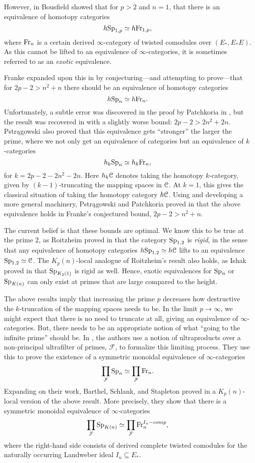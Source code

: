 However, in \cite{bousfield_1985} Bousfield showed that for $p>2$ and $n=1$, that there is an equivalence of homotopy categories
$$h \mathrm{Sp}_{1,p}\simeq h \mathrm{Fr}_{1,p},$$
where $\mathrm{Fr}_{n}$ is a certain derived $\infty$-category of twisted comodules over $(E_*, E_*E)$. As this cannot be lifted to an equivalence of $\infty$-categories, it is sometimes referred to as an \emph{exotic} equivalence. 

Franke expanded upon this in \cite{franke_96} by conjecturing---and attempting to prove---that for $2p-2 > n^2+n$ there should be an equivalence of homotopy categories
$$h \mathrm{Sp}_{n}\simeq h \mathrm{Fr}_{n}.$$
Unfortunately, a subtle error was discovered in the proof by Patchkoria in \cite{patchkoria_2013}, but the result was recovered in \cite{pstragowski_2021} with a slightly worse bound: $2p-2>2n^2+2n$. Pstr{\k a}gowski also proved that this equivalence gets ``stronger'' the larger the prime, where we not only get an equivalence of categories but an equivalence of $k$-categories 
$$h_k \mathrm{Sp}_{n}\simeq h_k \mathrm{Fr}_{n},$$
for $k=2p-2-2n^2-2n$. Here $h_k \EuScript{C}$ denotes taking the homotopy $k$-category, given by $(k-1)$-truncating the mapping spaces in $\EuScript{C}$. At $k=1$, this gives the classical situation of taking the homotopy category $h\EuScript{C}$. Using and developing a more general machinery, Pstr{\k a}gowski and Patchkoria proved in \cite{patchkoria-pstragowski_2021} that the above equivalence holds in Franke's conjectured bound, $2p-2>n^2+n$. 

The current belief is that these bounds are optimal. We know this to be true at the prime $2$, as Roitzheim proved in \cite{roitzheim_07} that the category $\mathrm{Sp}_{1,2}$ is \emph{rigid}, in the sense that any equivalence of homotopy categories $h\mathrm{Sp}_{1,2} \simeq h\EuScript{C}$ lifts to an equivalence $\mathrm{Sp}_{1,2}\simeq \EuScript{C}$. The $K_p(n)$-local analogue of Roitzheim's result also holds, as Ishak proved in \cite{ishak_19} that $\mathrm{Sp}_{K_2(1)}$ is rigid as well. Hence, exotic equivalences for $\mathrm{Sp}_{n}$ or $\mathrm{Sp}_{K(n)}$ can only exist at primes that are large compared to the height. 

The above results imply that increasing the prime $p$ decreases how destructive the $k$-truncation of the mapping spaces needs to be. In the limit $p\rightarrow \infty$, we might expect that there is no need to truncate at all, giving an equivalence of $\infty$-categories. But, there needs to be an appropriate notion of what ``going to the infinite prime'' should be. In \cite{barthel-schlank-stapleton_2020}, the authors use a notion of ultraproducts over a non-principal ultrafilter of primes, $\mathcal{F}$, to formalize this limiting process. They use this to prove the existence of a symmetric monoidal equivalence of $\infty$-categories
$$\prod_{\mathcal{F}}\mathrm{Sp}_{n} \simeq \prod_{\mathcal{F}}\mathrm{Fr}_{n}.$$ 
Expanding on their work, Barthel, Schlank, and Stapleton proved in \cite{barthel-schlank-stapleton_2021} a $K_p(n)$-local version of the above result. More precisely, they show that there is a symmetric monoidal equivalence of $\infty$-categories
$$\prod_{\mathcal{F}}\mathrm{Sp}_{K(n)} \simeq \prod_{\mathcal{F}}\mathrm{Fr}_{n}^{I_n-comp},$$
where the right-hand side consists of derived complete twisted comodules for the naturally occurring Landweber ideal $I_n\subseteq E_*$. 


